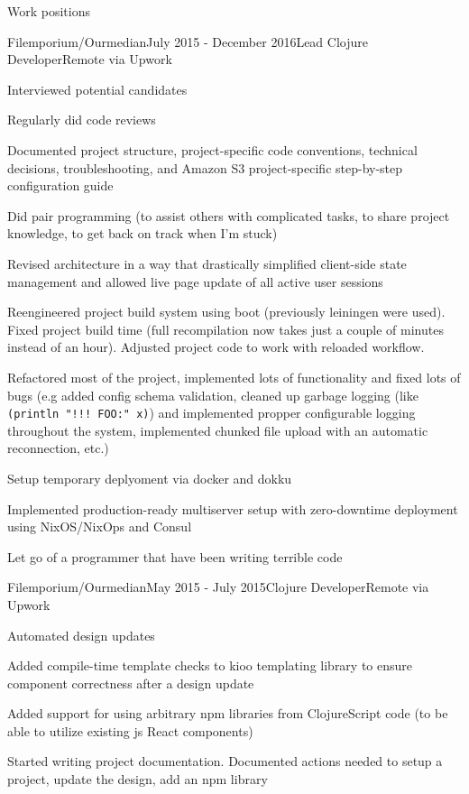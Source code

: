 \documentclass{resume} %
\begin{document}
\begin{rSection}{Work positions}
\begin{rSubsection}{Filemporium/Ourmedian}{July 2015 - December 2016}{Lead Clojure Developer}{Remote via Upwork}
\item Interviewed potential candidates
\item Regularly did code reviews
\item Documented project structure, project-specific code conventions, technical decisions,
  troubleshooting, and Amazon S3 project-specific step-by-step configuration guide
\item Did pair programming (to assist others with complicated tasks, to share project knowledge, to get
  back on track when I'm stuck)
\item Revised architecture in a way that drastically simplified client-side
  state management and allowed live page update of all active user sessions
\item Reengineered project build system using boot (previously leiningen were used).
  Fixed project build time (full recompilation now takes just a couple of minutes
  instead of an hour). Adjusted project code to work with reloaded workflow.
\item Refactored most of the project, implemented lots of functionality and fixed lots of bugs (e.g added
  config schema validation, cleaned up garbage logging (like {\tt (println "!!! FOO:" x)}) and implemented
  propper configurable logging throughout the system, implemented chunked file upload with an automatic reconnection, etc.)
\item Setup temporary deplyoment via docker and dokku
\item Implemented production-ready multiserver setup with zero-downtime deployment using NixOS/NixOps and Consul
\item Let go of a programmer that have been writing terrible code
\end{rSubsection}

\begin{rSubsection}{Filemporium/Ourmedian}{May 2015 - July 2015}{Clojure Developer}{Remote via Upwork}
\item Automated design updates
\item Added compile-time template checks to kioo templating library to ensure
  component correctness after a design update
\item Added support for using arbitrary npm libraries from ClojureScript code (to be
  able to utilize existing js React components)
\item Started writing project documentation. Documented actions needed to setup
  a project, update the design, add an npm library


\end{rSubsection}
\end{rSection}
\end{document}
